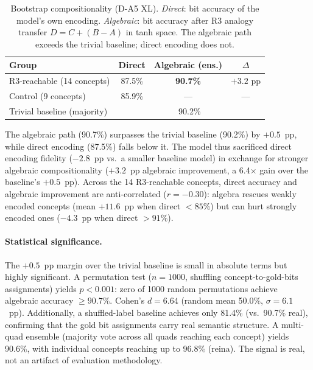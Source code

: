 \documentclass[11pt,a4paper]{article}
\begin{document}
\begin{table}[h]
\centering
\caption{Bootstrap compositionality (D-A5 XL). \emph{Direct}: bit accuracy of the model's own encoding. \emph{Algebraic}: bit accuracy after R3 analogy transfer $D = C + (B{-}A)$ in tanh space. The algebraic path exceeds the trivial baseline; direct encoding does not.}
\label{tab:bootstrap}
\begin{tabular}{lccc}
\toprule
Group & Direct & Algebraic (ens.) & $\Delta$ \\
\midrule
R3-reachable (14 concepts)  & 87.5\% & \textbf{90.7\%} & $+3.2$ pp \\
Control (9 concepts)        & 85.9\% & ---              & ---       \\
\midrule
Trivial baseline (majority) & \multicolumn{3}{c}{90.2\%}           \\
\bottomrule
\end{tabular}
\end{table}

The algebraic path (90.7\%) surpasses the trivial baseline (90.2\%) by $+0.5$~pp, while direct encoding (87.5\%) falls below it.
The model thus sacrificed direct encoding fidelity ($-2.8$~pp vs.\ a smaller baseline model) in exchange for stronger algebraic compositionality ($+3.2$~pp algebraic improvement, a 6.4$\times$ gain over the baseline's $+0.5$~pp).
Across the 14 R3-reachable concepts, direct accuracy and algebraic improvement are anti-correlated ($r = -0.30$): algebra rescues weakly encoded concepts (mean $+11.6$~pp when direct $< 85\%$) but can hurt strongly encoded ones ($-4.3$~pp when direct $> 91\%$).

\paragraph{Statistical significance.} The $+0.5$~pp margin over the trivial baseline is small in absolute terms but highly significant. A permutation test ($n=1000$, shuffling concept-to-gold-bits assignments) yields $p < 0.001$: zero of 1000 random permutations achieve algebraic accuracy $\geq 90.7\%$. Cohen's $d = 6.64$ (random mean 50.0\%, $\sigma = 6.1$~pp). Additionally, a shuffled-label baseline achieves only 81.4\% (vs.\ 90.7\% real), confirming that the gold bit assignments carry real semantic structure. A multi-quad ensemble (majority vote across all quads reaching each concept) yields 90.6\%, with individual concepts reaching up to 96.8\% (reina). The signal is real, not an artifact of evaluation methodology.
\end{document}
